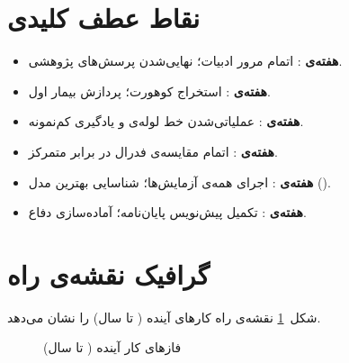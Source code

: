\section{نقاط عطف کلیدی}

\begin{itemize}
\item \textbf{هفته‌ی }: اتمام مرور ادبیات؛ نهایی‌شدن پرسش‌های پژوهشی.
\item \textbf{هفته‌ی }: استخراج کوهورت؛ پردازش  بیمار اول.
\item \textbf{هفته‌ی }: عملیاتی‌شدن خط لوله‌ی  و یادگیری کم‌نمونه.
\item \textbf{هفته‌ی }: اتمام مقایسه‌ی فدرال در برابر متمرکز.
\item \textbf{هفته‌ی }: اجرای همه‌ی آزمایش‌ها؛ شناسایی بهترین مدل ().
\item \textbf{هفته‌ی }: تکمیل پیش‌نویس پایان‌نامه؛ آماده‌سازی دفاع.
\end{itemize}

\section{گرافیک نقشه‌ی راه}

شکل~\ref{fig:roadmap} نقشه‌ی راه کارهای آینده ( تا  سال) را نشان می‌دهد.

\begin{figure}[htbp]
\centering
{}
\caption{فازهای کار آینده ( تا  سال)}
\label{fig:roadmap}
\end{figure}

